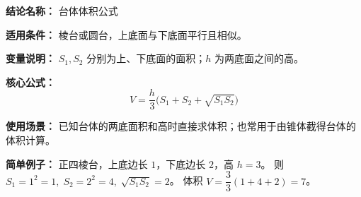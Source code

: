 \textbf{结论名称：} 台体体积公式

\textbf{适用条件：} 棱台或圆台，上底面与下底面平行且相似。

\textbf{变量说明：} \(S_1, S_2\) 分别为上、下底面的面积；\(h\) 为两底面之间的高。

\textbf{核心公式：} 
\[
\boxed{V = \frac{h}{3}\bigl(S_1 + S_2 + \sqrt{S_1 S_2}\bigr)}
\]

\textbf{使用场景：} 已知台体的两底面积和高时直接求体积；也常用于由锥体截得台体的体积计算。

\textbf{简单例子：} 正四棱台，上底边长 \(1\)，下底边长 \(2\)，高 \(h=3\)。  
则 \(S_1 = 1^2 = 1,\; S_2 = 2^2 = 4,\; \sqrt{S_1 S_2} = 2\)。  
体积 \(V = \dfrac{3}{3}(1+4+2) = 7\)。